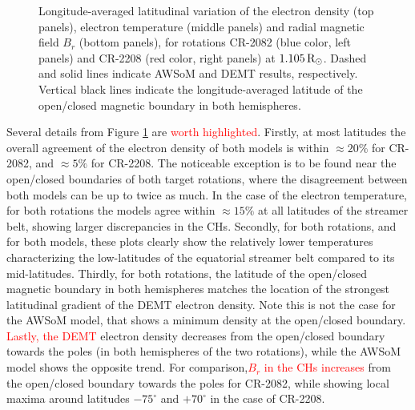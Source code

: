 \documentclass[namedreferences]{solarphysics}
\def\edit#1{\textcolor{Red}{#1}}
\newcommand{\mdeg}{^\circ}
\newcommand{\mrsun}{{\rm R_\odot}}
\begin{document}
\begin{article}
\begin{figure}[h!]
\begin{center}
\caption{Longitude-averaged latitudinal variation of the electron density ({top panels}), {electron temperature ({middle panels})} and {radial magnetic field $B_r$ (bottom panels), for rotations} CR-2082 ({blue color, left panels}) and CR-2208 ({red color, right panels) at} $1.105\,\mrsun$. Dashed and solid lines indicate AWSoM and DEMT results, respectively. Vertical black lines indicate the longitude-averaged latitude of the open/closed magnetic boundary in both hemispheres.}
\label{perf_lat}
\end{center}
\end{figure}

{{Several details from Figure \ref{perf_lat} are \edit{worth highlighted}. Firstly, at most latitudes the overall agreement of the electron density of both models is within $\approx 20\%$ for CR-2082, and $\approx 5\%$ for CR-2208. The noticeable exception is to be found near the open/closed boundaries of both target rotations, where the disagreement between both models can be up to twice as much. In the case of the electron temperature, for both rotations the models agree within $\approx 15\%$ at all latitudes of the streamer belt, showing larger discrepancies in the CHs.} Secondly, for both rotations, and for both models, these plots clearly show the relatively lower temperatures characterizing the low-latitudes of the equatorial streamer belt compared to its mid-latitudes. Thirdly, for both rotations, the latitude of the open/closed magnetic boundary in both hemispheres matches the location of the strongest latitudinal gradient of the DEMT electron density. Note this is not the case for the AWSoM model, that shows a minimum density at the open/closed boundary. \edit{Lastly, the DEMT} electron density decreases from the open/closed boundary towards the poles (in both hemispheres of the two rotations), while the AWSoM model shows the opposite trend. {For comparison,\edit{$B_r$ in the CHs increases} from the open/closed boundary towards the poles for CR-2082, while showing local maxima around latitudes $-75\mdeg$ and $+70\mdeg$ in the case of CR-2208.}}


\end{article}
\end{document}
